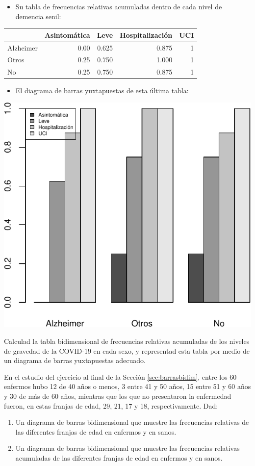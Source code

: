 \documentclass[
]{book}
\providecommand{\tightlist}{%
  \setlength{\itemsep}{0pt}\setlength{\parskip}{0pt}}
\theoremstyle{definition}
\theoremstyle{definition}
\theoremstyle{definition}
\theoremstyle{definition}
\theoremstyle{remark}
\begin{document}
\begin{itemize}
\tightlist
\item
  Su tabla de frecuencias relativas acumuladas dentro de cada nivel de demencia senil:
\end{itemize}

\begin{tabular}{l|r|r|r|r}
\hline
  & Asintomática & Leve & Hospitalización & UCI\\
\hline
Alzheimer & 0.00 & 0.625 & 0.875 & 1\\
\hline
Otros & 0.25 & 0.750 & 1.000 & 1\\
\hline
No & 0.25 & 0.750 & 0.875 & 1\\
\hline
\end{tabular}

\begin{itemize}
\tightlist
\item
  El diagrama de barras yuxtapuestas de esta última tabla:
\end{itemize}

\begin{center}\includegraphics[width=0.5\linewidth]{INREMDN_files/figure-latex/unnamed-chunk-245-1} \end{center}

\begin{rmdexercici}
Calculad la tabla bidimensional de frecuencias relativas acumuladas de los niveles de gravedad de la COVID-19 en cada sexo, y representad esta tabla por medio de un diagrama de barras yuxtapuestas adecuado.
\end{rmdexercici}

\begin{rmdexercici}
En el estudio del ejercicio al final de la Sección \ref{sec:barrasbidim}, entre los 60 enfermos hubo 12 de 40 años o menos, 3 entre 41 y 50 años, 15 entre 51 y 60 años y 30 de más de 60 años, mientras que los que no presentaron la enfermedad fueron, en estas franjas de edad, 29, 21, 17 y 18, respectivamente. Dad:

\begin{enumerate}
\def\labelenumi{\alph{enumi}.}
\item
  Un diagrama de barras bidimensional que muestre las frecuencias relativas de las diferentes franjas de edad en enfermos y en sanos.
\item
  Un diagrama de barras bidimensional que muestre las frecuencias relativas acumuladas de las diferentes franjas de edad en enfermos y en sanos.
\end{enumerate}
\end{rmdexercici}
\end{document}
